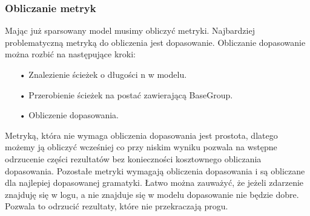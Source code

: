 \subsubsection{Obliczanie metryk}
Mając już sparsowany model musimy obliczyć metryki. Najbardziej problematyczną metryką do obliczenia jest dopasowanie. Obliczanie dopasowanie można rozbić na następujące kroki:
\begin{itemize}
  \item[•] Znalezienie ścieżek o długości n w modelu.
  \item[•] Przerobienie ścieżek na postać zawierającą BaseGroup.
  \item[•] Obliczenie dopasowania.
\end{itemize}
Metryką, która nie wymaga obliczenia dopasowania jest prostota, dlatego możemy ją obliczyć wcześniej co przy niskim wyniku pozwala na wstępne odrzucenie części rezultatów bez konieczności kosztownego obliczania dopasowania. 
Pozostałe metryki wymagają obliczenia dopasowania i są obliczane dla najlepiej dopasowanej gramatyki.
Łatwo można zauważyć, że jeżeli zdarzenie znajduję się w logu, a nie znajduje się w modelu dopasowanie nie będzie dobre. Pozwala to odrzucić rezultaty, które nie przekraczają progu. 
\clearpage
